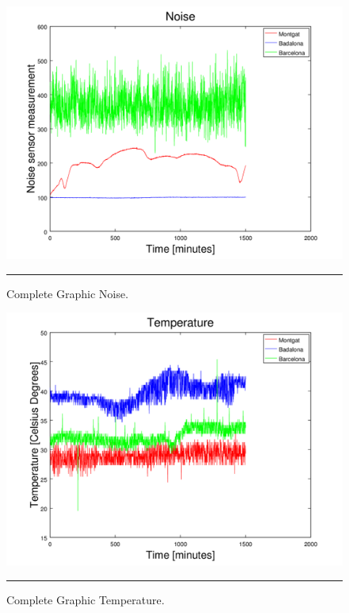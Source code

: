 \documentclass[12pt, a4paper,twoside]{tesi_upf}
\begin{document}
    \begin{figure}[H]
      \centering
        \includegraphics[page=1,scale=0.8]{./Figures/CompleteGraphicNoise.png}
      \rule{35em}{0.5pt}
      \caption[Complete Graphic Noise]{Complete Graphic Noise.}
      \label{fig:CompleteGraphicNoise}
    \end{figure}
    
    \begin{figure}[H]
      \centering
        \includegraphics[page=1,scale=0.8]{./Figures/CompleteGraphicTemperature.png}
      \rule{35em}{0.5pt}
      \caption[Complete Graphic Temperature]{Complete Graphic Temperature.}
      \label{fig:CompleteGraphicTemperature}
    \end{figure}
  


\backmatter
\printindex
\end{document}
